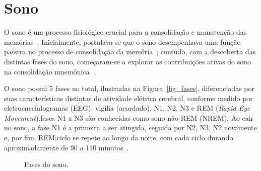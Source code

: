 \section{Sono}

O sono é um processo fisiológico crucial para a consolidação e manutenção das memórias~\cite{blissittSleep2001, walkerSleep2006,
diekelmannMemory2010}. Inicialmente, postulava-se que o sono desempenhava uma função passiva no processo de consolidação da
memória~\cite{jenkinsObliviscence1924}; contudo, com a descoberta das distintas fases do sono, começaram-se a explorar as
contribuições ativas do sono na consolidação mnemônica~\cite{aserinskyRegularly1953}.

O sono possui 5 fases no total, ilustradas na Figura~\ref{fig_fases}, diferenciadas por suas características distintas de
atividade elétrica cerebral, conforme medido por eletroencefalogramas (EEG)\cite{silberVisual2007}: vigília (acordado), N1, N2, N3
e REM (\textit{Rapid Eye Movement}).\@As fases N1 a N3 são conhecidas como sono não-REM (NREM). Ao cair no sono, a fase N1 é a
primeira a ser atingida, seguida por N2, N3, N2 novamente e, por fim, REM;\@esse ciclo se repete ao longo da noite, com cada ciclo
durando aproximadamente de 90 a 110 minutos~\cite{k.patelPhysiology2022}.

\begin{figure}[!ht]
\caption{Fases do sono.}
\end{figure}

